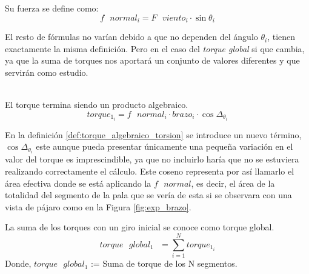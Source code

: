  

 \begin{definicion}
  Su fuerza se define como:
  $$ f \text{ } normal_i = F \text{ } viento_i \cdot \sin{\theta_i}$$
  \label{def:fuerza_normal_torsion}
 \end{definicion}

El resto de fórmulas no varían debido a que no dependen del ángulo $\theta_i$, tienen exactamente la misma definición. Pero en el caso del \textit{torque global} si que cambia, ya que la suma de torques nos aportará un conjunto de valores diferentes y que servirán como estudio. \\\\

  \begin{definicion}
  El torque termina siendo un producto algebraico.
 $$ torque_{1_i} = f \text{ } normal_i \cdot brazo_i \cdot \cos{\Delta_{\theta_{i}}}$$
 \label{def:torque_algebraico_torsion}
 \end{definicion}
 
 En la definición \ref{def:torque_algebraico_torsion} se introduce un nuevo término, $ \cos{\Delta_{\theta_{i}}} $ este aunque pueda presentar únicamente una pequeña variación en el valor del torque es imprescindible, ya que no incluirlo haría que no se estuviera realizando correctamente el cálculo. Este coseno representa por así llamarlo el área efectiva donde se está aplicando la $ f \text{ } normal $, es decir, el área de la totalidad del segmento de la pala que se vería de esta si se observara con una vista de pájaro como en la Figura \ref{fig:exp_brazo}. \\

\begin{definicion}
 La suma de los torques con un giro inicial se conoce como torque global.
 $$ torque \text{ } global_1 \text{ } = \sum_{i=1}^{N} torque_{1_i} $$
Donde,
\centering $torque \text{ } global_1$ := Suma de torque de los N segmentos.
 \label{def:torque_global_1}
\end{definicion}






















